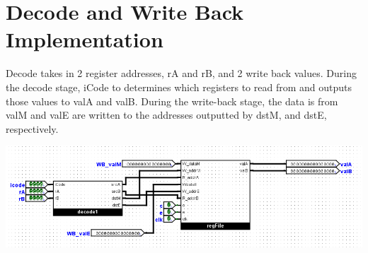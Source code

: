 \documentclass{article}
\begin{document}
\section{Decode and Write Back Implementation}
Decode takes in 2 register addresses, rA and rB, and 2 write back values. During the decode stage, iCode to determines which registers to read from and outputs those values to valA and valB. During the write-back stage, the data is from valM and valE are written to the addresses outputted by dstM, and dstE, respectively. 
\begin{center}
    \includegraphics[scale=.6]{decode.png}
\end{center}
\end{document}
